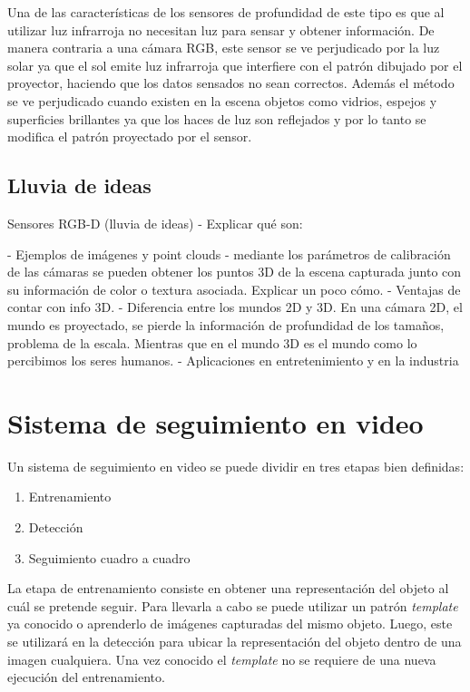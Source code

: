 Una de las características de los sensores de profundidad de este tipo es que al utilizar luz infrarroja no necesitan luz para sensar y obtener información. De manera contraria a una cámara RGB, este sensor se ve perjudicado por la luz solar ya que el sol emite luz infrarroja que interfiere con el patrón dibujado por el proyector, haciendo que los datos sensados no sean correctos. Además el método se ve perjudicado cuando existen en la escena objetos como vidrios, espejos y superficies brillantes ya que los haces de luz son reflejados y por lo tanto se modifica el patrón proyectado por el sensor.


\section{Lluvia de ideas}
Sensores RGB-D (lluvia de ideas)
- Explicar qué son:

- Ejemplos de imágenes y point clouds
- mediante los parámetros de calibración de las cámaras se pueden obtener los puntos 3D de la escena capturada junto con su información de color o textura asociada. Explicar un poco cómo.
- Ventajas de contar con info 3D. 
- Diferencia entre los mundos 2D y 3D. En una cámara 2D, el mundo es proyectado,  se pierde la información de profundidad de los tamaños, problema de la escala. Mientras que en el mundo 3D es el mundo como lo percibimos los seres humanos.
- Aplicaciones en entretenimiento y en la industria




\chapter{Sistema de seguimiento en video}

Un sistema de seguimiento en video se puede dividir en tres etapas bien definidas:
\begin{enumerate}
 \item Entrenamiento
 \item Detección
 \item Seguimiento cuadro a cuadro
\end{enumerate}

La etapa de entrenamiento consiste en obtener una representación del objeto al cuál se pretende seguir. Para llevarla a cabo se puede utilizar un patrón \textit{template} ya conocido o aprenderlo de imágenes capturadas del mismo objeto. Luego, este se utilizará en la detección para ubicar la representación del objeto dentro de una imagen cualquiera. Una vez conocido el \textit{template} no se requiere de una nueva ejecución del entrenamiento.

